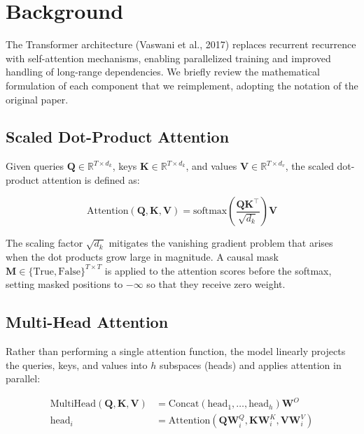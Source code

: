 \section{Background}

The Transformer architecture (Vaswani et al., 2017) replaces recurrent recurrence with self-attention mechanisms, enabling parallelized training and improved handling of long-range dependencies. We briefly review the mathematical formulation of each component that we reimplement, adopting the notation of the original paper.

\subsection{Scaled Dot-Product Attention}

Given queries $\mathbf{Q} \in \mathbb{R}^{T \times d_k}$, keys $\mathbf{K} \in \mathbb{R}^{T \times d_k}$, and values $\mathbf{V} \in \mathbb{R}^{T \times d_v}$, the scaled dot-product attention is defined as:

\begin{equation}
\text{Attention}(\mathbf{Q}, \mathbf{K}, \mathbf{V}) = \text{softmax}\!\left(\frac{\mathbf{Q} \mathbf{K}^\top}{\sqrt{d_k}}\right) \mathbf{V}
\end{equation}

The scaling factor $\sqrt{d_k}$ mitigates the vanishing gradient problem that arises when the dot products grow large in magnitude. A causal mask $\mathbf{M} \in \{\text{True}, \text{False}\}^{T \times T}$ is applied to the attention scores before the softmax, setting masked positions to $-\infty$ so that they receive zero weight.

\subsection{Multi-Head Attention}

Rather than performing a single attention function, the model linearly projects the queries, keys, and values into $h$ subspaces (heads) and applies attention in parallel:

\begin{equation}
\begin{aligned}
\text{MultiHead}(\mathbf{Q}, \mathbf{K}, \mathbf{V}) &= \text{Concat}(\text{head}_1, \ldots, \text{head}_h) \mathbf{W}^O \\
\text{head}_i &= \text{Attention}(\mathbf{Q} \mathbf{W}_i^Q, \mathbf{K} \mathbf{W}_i^K, \mathbf{V} \mathbf{W}_i^V)
\end{aligned}
\end{equation}


